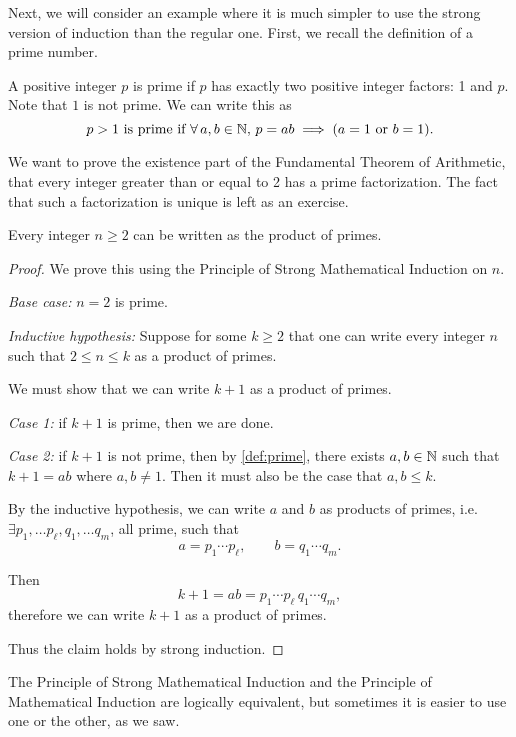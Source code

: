 \documentclass{article}
\begin{document}
Next, we will consider an example where it is much simpler to use the strong version of induction than the regular one. First, we recall the definition of a prime number.

\begin{definition}
\label{def:prime}
A positive integer $p$ is prime if $p$ has exactly two positive integer factors: 1 and $p$. Note that $1$ is not prime. We can write this as 
$$ p > 1 \text{ is prime if } \forall \, a, b \in {\mathbb{N}}, \, p=ab \implies (a = 1 \text{ or } b =1).$$
\end{definition}

We want to prove the existence part of the Fundamental Theorem of Arithmetic, that every integer greater than or equal to 2 has a prime factorization. The fact that such a factorization is unique is left as an exercise.

\begin{example}
Every integer $n \geq 2$ can be written as the product of primes.
\end{example}

\begin{proof}
We prove this using the Principle of Strong Mathematical Induction on $n$.

{\it Base case:} $n = 2$ is prime. 

{\it Inductive hypothesis:} Suppose for some $k \geq 2$ that one can write every integer $n$ such that $2 \leq n \leq k$ as a product of primes.

We must show that we can write $k+1$ as a product of primes.

{\it Case 1:} if $k+1$ is prime, then we are done. 

{\it Case 2:} if $k+1$ is not prime, then by \cref{def:prime}, there exists $a,b \in {\mathbb{N}}$ such that $k+1 = ab$ where $a,b \neq 1$. Then it must also be the case that $a,b \leq k$.

By the inductive hypothesis, we can write $a$ and $b$ as products of primes, i.e. $\exists p_1, \ldots p_\ell, q_1, \ldots q_m$, all prime, such that 
$$ a = p_1 \cdots p_\ell, \qquad b = q_1 \cdots q_m.$$

Then 
$$ k+1 = ab =  p_1 \cdots p_\ell \, q_1 \cdots q_m, $$
therefore we can write $k+1$ as a product of primes.

Thus the claim holds by strong induction.
\end{proof}

The Principle of Strong Mathematical Induction and the Principle of Mathematical Induction are logically equivalent, but sometimes it is easier to use one or the other, as we saw.
\end{document}
